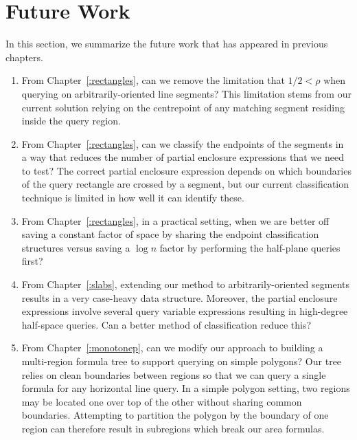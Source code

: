 \section{Future Work}
\label{:conclusion:open-problems}

In this section, we summarize the future work that has appeared in previous chapters.

\begin{enumerate}
\item From Chapter~\ref{:rectangles}, can we remove the limitation that $1/2 < \rho$ when querying on arbitrarily-oriented line segments?  
This limitation stems from our current solution relying on the centrepoint of any matching segment residing inside the query region.

\item From Chapter~\ref{:rectangles}, can we classify the endpoints of the segments in a way that reduces the number of partial enclosure expressions that we need to test?
The correct partial enclosure expression depends on which boundaries of the query rectangle are crossed by a segment, but our current classification technique is limited in how well it can identify these.

\item From Chapter~\ref{:rectangles}, in a practical setting, when we are better off saving a constant factor of space by sharing the endpoint classification structures versus saving a $\log{n}$ factor by performing the half-plane queries first?

\item From Chapter~\ref{:slabs}, extending our method to arbitrarily-oriented segments results in a very case-heavy data structure. 
Moreover, the partial enclosure expressions involve several query variable expressions resulting in high-degree half-space queries. 
Can a better method of classification reduce this?

\item From Chapter~\ref{:monotonep}, can we modify our approach to building a multi-region formula tree to support querying on simple polygons?  
Our tree relies on clean boundaries between regions so that we can query a single formula for any horizontal line query. 
In a simple polygon setting, two regions may be located one over top of the other without sharing common boundaries.
Attempting to partition the polygon by the boundary of one region can therefore result in subregions which break our area formulas.

\end{enumerate}

